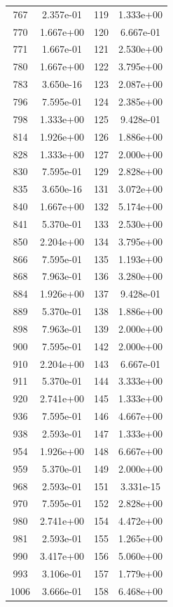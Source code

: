 \documentclass[12pt]{article}
\begin{document}
\begin{longtable}{@{}cccc@{}}
767 & 2.357e-01 & 119 & 1.333e+00 \\
770 & 1.667e+00 & 120 & 6.667e-01 \\
771 & 1.667e-01 & 121 & 2.530e+00 \\
780 & 1.667e+00 & 122 & 3.795e+00 \\
783 & 3.650e-16 & 123 & 2.087e+00 \\
796 & 7.595e-01 & 124 & 2.385e+00 \\
798 & 1.333e+00 & 125 & 9.428e-01 \\
814 & 1.926e+00 & 126 & 1.886e+00 \\
828 & 1.333e+00 & 127 & 2.000e+00 \\
830 & 7.595e-01 & 129 & 2.828e+00 \\
835 & 3.650e-16 & 131 & 3.072e+00 \\
840 & 1.667e+00 & 132 & 5.174e+00 \\
841 & 5.370e-01 & 133 & 2.530e+00 \\
850 & 2.204e+00 & 134 & 3.795e+00 \\
866 & 7.595e-01 & 135 & 1.193e+00 \\
868 & 7.963e-01 & 136 & 3.280e+00 \\
884 & 1.926e+00 & 137 & 9.428e-01 \\
889 & 5.370e-01 & 138 & 1.886e+00 \\
898 & 7.963e-01 & 139 & 2.000e+00 \\
900 & 7.595e-01 & 142 & 2.000e+00 \\
910 & 2.204e+00 & 143 & 6.667e-01 \\
911 & 5.370e-01 & 144 & 3.333e+00 \\
920 & 2.741e+00 & 145 & 1.333e+00 \\
936 & 7.595e-01 & 146 & 4.667e+00 \\
938 & 2.593e-01 & 147 & 1.333e+00 \\
954 & 1.926e+00 & 148 & 6.667e+00 \\
959 & 5.370e-01 & 149 & 2.000e+00 \\
968 & 2.593e-01 & 151 & 3.331e-15 \\
970 & 7.595e-01 & 152 & 2.828e+00 \\
980 & 2.741e+00 & 154 & 4.472e+00 \\
981 & 2.593e-01 & 155 & 1.265e+00 \\
990 & 3.417e+00 & 156 & 5.060e+00 \\
993 & 3.106e-01 & 157 & 1.779e+00 \\
1006 & 3.666e-01 & 158 & 6.468e+00 \\

\end{longtable}
\end{document}
